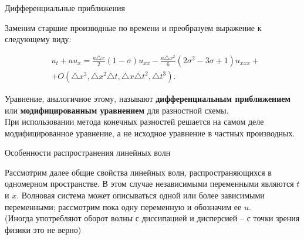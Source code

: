 \documentclass[10pt,xcolor=pst,aspectratio=169]{beamer}
\begin{document}
\begin{frame}{Дифференциальные приближения}

    \transdissolve[duration=0.1]
    \justifying
    \large

    Заменим старшие производные по времени и преобразуем выражение к следующему виду:

    \[
        \begin{split}
            &u_{t} + a u_{x} = \frac{a \triangle x}{2} (1 - \sigma) \boxed{u_{xx}} - \frac{a \triangle x^{2}}{6} (2 \sigma^{2} - 3 \sigma + 1) \boxed{u_{xxx}} +\\
            & + O(\triangle x^{3}, \triangle x^{2} \triangle t, \triangle x \triangle t^{2}, \triangle t^{3}).
        \end{split}
    \]

    Уравнение, аналогичное этому, называют \textbf{дифференциальным приближением} или \textbf{модифицированным уравнением} для разностной схемы.\\

    При использовании метода конечных разностей решается на самом деле модифицированное уравнение, а не исходное уравнение в частных производных.

\end{frame}

%
%
%
%

\begin{frame}{Особенности распространения линейных волн}

    \transdissolve[duration=0.1]
    \justifying
    \large

    Рассмотрим далее общие свойства линейных волн, распространяющихся в одномерном пространстве. В этом случае независимыми переменными являются $t$ и $x$. Волновая система может описываться одной или более зависимыми переменными; рассмотрим пока одну переменную и обозначим ее $u$.\\

    (Иногда употребляют оборот волны с диссипацией и дисперсией -- с точки зрения физики это не верно)

\end{frame}
\end{document}
